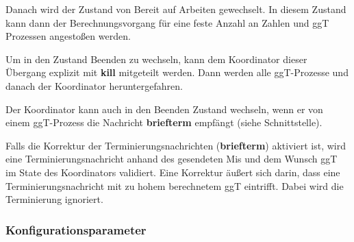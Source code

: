 \documentclass{article}
\begin{document}
Danach wird der Zustand von Bereit auf Arbeiten gewechselt. In diesem Zustand kann dann der Berechnungsvorgang für eine
feste Anzahl an Zahlen und ggT Prozessen angestoßen werden.

Um in den Zustand Beenden zu wechseln, kann dem Koordinator dieser Übergang explizit mit \textbf{kill} mitgeteilt werden.
Dann werden alle ggT-Prozesse und danach der Koordinator heruntergefahren.

Der Koordinator kann auch in den Beenden Zustand wechseln, wenn er von einem ggT-Prozess die Nachricht \textbf{briefterm}
empfängt (siehe Schnittstelle).

Falls die Korrektur der Terminierungsnachrichten (\textbf{briefterm}) aktiviert ist, wird eine Terminierungsnachricht
anhand des gesendeten Mis und dem Wunsch ggT im State des Koordinators validiert. Eine Korrektur äußert sich darin,
dass eine Terminierungsnachricht mit zu hohem berechnetem ggT eintrifft. Dabei wird die Terminierung ignoriert.

\subsubsection{Konfigurationsparameter}
\end{document}
